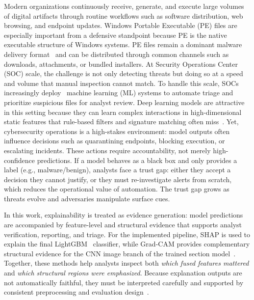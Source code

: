 \documentclass[conference]{IEEEtran}
\begin{document}

Modern organizations continuously receive, generate, and execute large volumes of digital artifacts through routine workflows such as software distribution, web browsing, and endpoint updates.
Windows Portable Executable (PE) files are especially important from a defensive standpoint because PE is the native executable structure of Windows systems.
PE files remain a dominant malware delivery format~\cite{opentext2025} and can be distributed through common channels such as downloads, attachments, or bundled installers.
At Security Operations Center (SOC) scale, the challenge is not only detecting threats but doing so at a speed and volume that manual inspection cannot match.
To handle this scale, SOCs increasingly deploy~\cite{SDRS2025} machine learning (ML) systems to automate triage and prioritize suspicious files for analyst review.
Deep learning models are attractive in this setting because they can learn complex interactions in high-dimensional static features that rule-based filters and signature matching often miss~\cite{DSR2025ai}.
Yet, cybersecurity operations is a high-stakes environment: model outputs often influence decisions such as quarantining endpoints, blocking execution, or escalating incidents.
These actions require accountability, not merely high-confidence predictions.
If a model behaves as a black box and only provides a label (e.g., malware/benign), analysts face a trust gap: either they accept a decision they cannot justify, or they must re-investigate alerts from scratch, which reduces the operational value of automation.
The trust gap grows as threats evolve and adversaries manipulate surface cues.


In this work, explainability is treated as evidence generation: model predictions are accompanied by feature-level and structural evidence that supports analyst verification, reporting, and triage.
For the implemented pipeline, SHAP is used to explain the final LightGBM~\cite{lightgbm} classifier, while Grad-CAM provides complementary structural evidence for the CNN image branch of the trained section model~\cite{LL2017,SCDVPB2017}.
Together, these methods help analysts inspect both \emph{which fused features mattered} and \emph{which structural regions were emphasized}.
Because explanation outputs are not automatically faithful, they must be interpreted carefully and supported by consistent preprocessing and evaluation design~\cite{JW2019}.
\end{document}
